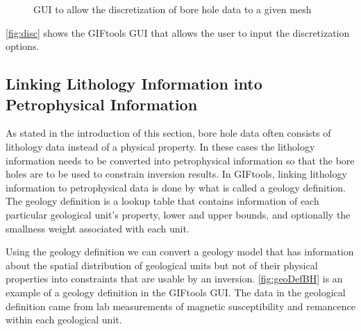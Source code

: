  \begin{figure} [h]
    \centering
    \caption{\ac{GUI} to allow the discretization of bore hole data to a given mesh}
    \label{fig:disc}
\end{figure}

\autoref{fig:disc} shows the GIFtools \ac{GUI} that allows the user to input the discretization options.

\subsection{Linking Lithology Information into Petrophysical Information}
\label{subsec:lithBH}

As stated in the introduction of this section, bore hole data often consists of lithology data instead of a physical property. In these cases the lithology information needs to be converted into petrophysical information so that the bore holes are to be used to constrain inversion results. In GIFtools, linking lithology information to petrophysical data is done by what is called a geology definition. The geology definition is a lookup table that contains information of each particular geological unit's property, lower and upper bounds, and optionally the smallness weight associated with each unit. 

Using the geology definition we can convert a geology model that has information about the spatial distribution of geological units but not of their physical properties into constraints that are usable by an inversion. \autoref{fig:geoDefBH} is an example of a geology definition in the GIFtools GUI. The data in the geological definition came from lab measurements of magnetic susceptibility and remancence within each geological unit.

